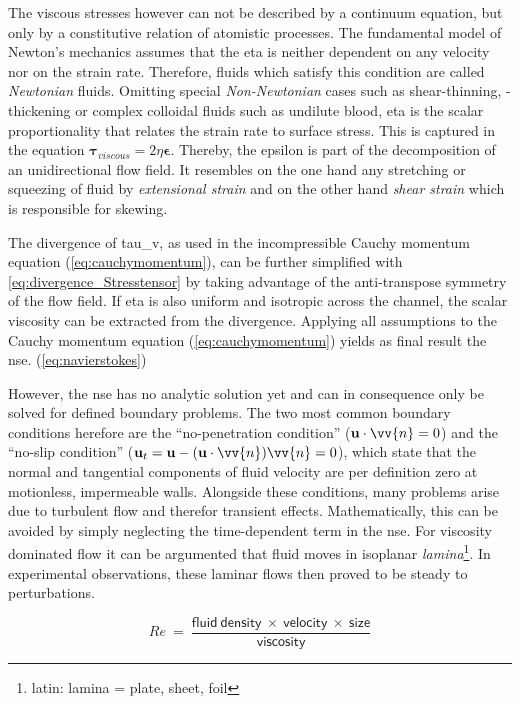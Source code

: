 The viscous stresses however can not be described by a continuum equation, but only by a constitutive relation of atomistic processes. The fundamental model of Newton's mechanics assumes that the \gls{eta} is neither dependent on any velocity nor on the strain rate. Therefore, fluids which satisfy this condition are called \textit{Newtonian} fluids. Omitting special \textit{Non-Newtonian} cases such as shear-thinning, -thickening or complex colloidal fluids such as undilute blood, \gls{eta} is the scalar proportionality that relates the strain rate to surface stress.\cite{lit:fluidic:kirby} This is captured in the equation $\boldsymbol{\tau}_{viscous} = 2\eta \mathbf{\epsilon} $. Thereby, the \gls{epsilon} is part of the decomposition of an unidirectional flow field. It resembles on the one hand any stretching or squeezing of fluid by \textit{extensional strain} and on the other hand \textit{shear strain} which is responsible for skewing.\cite{lit:fluidic:kirby}

The divergence of \gls{tau_v}, as used in the incompressible Cauchy momentum equation (\cref{eq:cauchymomentum}), can be further simplified with \cref{eq:divergence_Stresstensor} by taking advantage of the anti-transpose symmetry of the flow field.\cite{lit:fluidic:kirby} If \gls{eta} is also uniform and isotropic across the channel, the scalar viscosity can be extracted from the divergence.  Applying all assumptions to the Cauchy momentum equation (\cref{eq:cauchymomentum}) yields as final result the \gls{nse}. (\cref{eq:navierstokes}) 

However, the \gls{nse} has no analytic solution yet and can in consequence only be solved for defined boundary problems. The two most common boundary conditions herefore are the ``no-penetration condition'' ($\mathbf{u} \cdot \vv{n} = 0$) and the ``no-slip condition'' ($\mathbf{u}_t = \mathbf{u} - (\mathbf{u}\cdot \vv{n}) \vv{n} = 0$), which state that the normal and tangential components of fluid velocity are per definition zero at motionless, impermeable walls.\newline
Alongside these conditions, many problems arise due to turbulent flow and therefor transient effects. Mathematically, this can be avoided by simply neglecting the time-dependent term in the \gls{nse}. For viscosity dominated flow it can be argumented that fluid moves in isoplanar \textit{lamina}\footnote{latin: lamina = plate, sheet, foil}. In experimental observations, these laminar flows then proved to be steady to perturbations.

\begin{equation}
	\mathit{Re}\ =\ \frac{\mathrm{\mathsf{fluid\ density\ \times \ velocity\ \times\ size}}}{\mathrm{\mathsf{viscosity}}} \label{eq:reynolds}
\end{equation}

